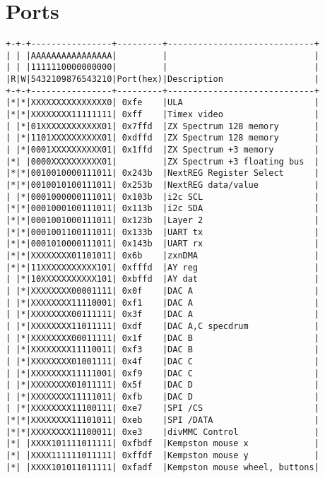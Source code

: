 \chapter{Ports}
\begin{verbatim}
+-+-+----------------+---------+-----------------------------+
| | |AAAAAAAAAAAAAAAA|         |                             |
| | |1111110000000000|         |                             |
|R|W|5432109876543210|Port(hex)|Description                  |
+-+-+----------------+---------+-----------------------------+
|*|*|XXXXXXXXXXXXXXX0| 0xfe    |ULA                          |
|*|*|XXXXXXXX11111111| 0xff    |Timex video                  |  
| |*|01XXXXXXXXXXXX01| 0x7ffd  |ZX Spectrum 128 memory       |  
| |*|1101XXXXXXXXXX01| 0xdffd  |ZX Spectrum 128 memory       |  
| |*|0001XXXXXXXXXX01| 0x1ffd  |ZX Spectrum +3 memory        |  
|*| |0000XXXXXXXXXX01|         |ZX Spectrum +3 floating bus  |  
|*|*|0010010000111011| 0x243b  |NextREG Register Select      |  
|*|*|0010010100111011| 0x253b  |NextREG data/value           |  
| |*|0001000000111011| 0x103b  |i2c SCL                      |  
|*|*|0001000100111011| 0x113b  |i2c SDA                      |  
|*|*|0001001000111011| 0x123b  |Layer 2                      |  
|*|*|0001001100111011| 0x133b  |UART tx                      |  
|*|*|0001010000111011| 0x143b  |UART rx                      |  
|*|*|XXXXXXXX01101011| 0x6b    |zxnDMA                       |  
|*|*|11XXXXXXXXXXX101| 0xfffd  |AY reg                       |  
| |*|10XXXXXXXXXXX101| 0xbffd  |AY dat                       |  
| |*|XXXXXXXX00001111| 0x0f    |DAC A                        |  
| |*|XXXXXXXX11110001| 0xf1    |DAC A                        |  
| |*|XXXXXXXX00111111| 0x3f    |DAC A                        |  
| |*|XXXXXXXX11011111| 0xdf    |DAC A,C specdrum             |  
| |*|XXXXXXXX00011111| 0x1f    |DAC B                        |  
| |*|XXXXXXXX11110011| 0xf3    |DAC B                        |  
| |*|XXXXXXXX01001111| 0x4f    |DAC C                        |  
| |*|XXXXXXXX11111001| 0xf9    |DAC C                        |  
| |*|XXXXXXXX01011111| 0x5f    |DAC D                        |  
| |*|XXXXXXXX11111011| 0xfb    |DAC D                        |  
| |*|XXXXXXXX11100111| 0xe7    |SPI /CS                      |  
|*|*|XXXXXXXX11101011| 0xeb    |SPI /DATA                    |  
|*|*|XXXXXXXX11100011| 0xe3    |divMMC Control               |  
|*| |XXXX101111011111| 0xfbdf  |Kempston mouse x             |
|*| |XXXX111111011111| 0xffdf  |Kempston mouse y             |
|*| |XXXX101011011111| 0xfadf  |Kempston mouse wheel, buttons|  

\end{verbatim}
